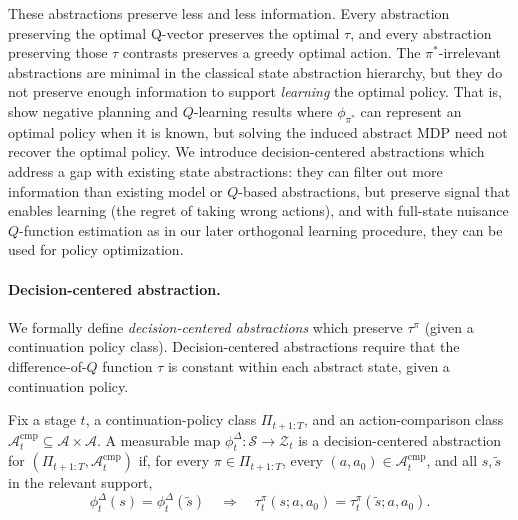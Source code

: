 \documentclass[opre,nonblindrev]{informs4}
\newenvironment{revision}{\begingroup\color{revisionblue}\ignorespaces}{\endgroup}
\newcommand{\blipadv}{\tau}
\begin{document}
\begin{revision}
These abstractions preserve less and less information. Every abstraction preserving the optimal Q-vector preserves the optimal $\blipadv$, and every abstraction preserving those $\blipadv$ contrasts preserves a greedy optimal action. 
The $\pi^*$-irrelevant abstractions are minimal in the classical state abstraction hierarchy, but they do not preserve enough information to support \textit{learning} the optimal policy. That is, \citet{li2006towards} show negative planning and $Q$-learning results where \(\phi_{\pi^*}\) can represent an optimal policy when it is known, but solving the induced abstract MDP need not recover the optimal policy. We introduce decision-centered abstractions which address a gap with existing state abstractions: they can filter out more information than existing model or $Q$-based abstractions, but preserve signal that enables learning (the regret of taking wrong actions), and with full-state nuisance $Q$-function estimation as in our later orthogonal learning procedure, they can be used for policy optimization.


\paragraph{Decision-centered abstraction.}

We formally define \textit{decision-centered abstractions} which preserve $\blipadv^\pi$ (given a continuation policy class). Decision-centered abstractions require that the difference-of-$Q$ function $\blipadv$ is constant within each abstract state, given a continuation policy. 

\begin{definition}
\label{def:decision-centered}
Fix a stage \(t\), a continuation-policy class
\(\Pi_{t+1:T}\), and an action-comparison class
\(\mathcal A_t^{\mathrm{cmp}}\subseteq\mathcal A\times\mathcal A\).
A measurable map \(\phi_t^\Delta:\mathcal S\to\mathcal Z_t\) is a
decision-centered abstraction for
\((\Pi_{t+1:T},\mathcal A_t^{\mathrm{cmp}})\) if, for every
\(\pi\in\Pi_{t+1:T}\), every
\((a,a_0)\in\mathcal A_t^{\mathrm{cmp}}\), and all \(s,\tilde s\)
in the relevant support,
\[
\phi_t^\Delta(s)=\phi_t^\Delta(\tilde s)
\quad\Longrightarrow\quad
\blipadv_t^\pi(s;a,a_0)=\blipadv_t^\pi(\tilde s;a,a_0).
\]
\end{definition}



\end{revision}
\end{document}
